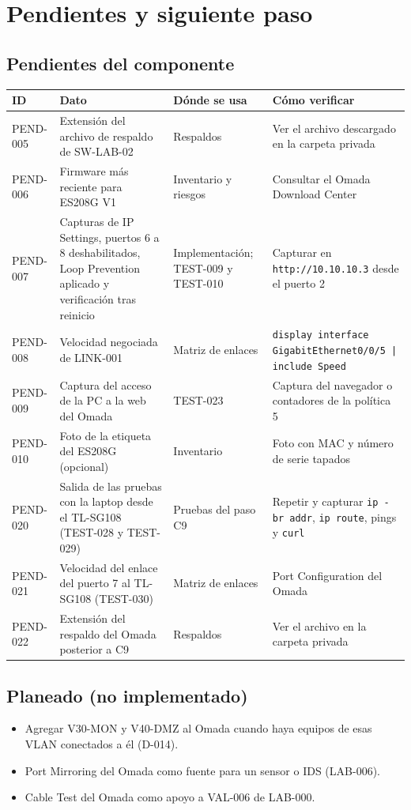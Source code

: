 \documentclass[11pt,a4paper]{article}
\newcommand{\cab}{\rowcolor{light}}
\begin{document}
\section{Pendientes y siguiente paso}
\subsection{Pendientes del componente}
{\small
\begin{longtable}{L{1.6cm} L{4.7cm} L{3.6cm} L{4.8cm}}
  \toprule
  \cab\textbf{ID} & \textbf{Dato} & \textbf{Dónde se usa} & \textbf{Cómo verificar}\\
  \midrule
  \endhead
  PEND-005 & Extensión del archivo de respaldo de SW-LAB-02 & Respaldos & Ver el archivo descargado en la carpeta privada\\
  PEND-006 & Firmware más reciente para ES208G V1 & Inventario y riesgos & Consultar el Omada Download Center\\
  PEND-007 & Capturas de IP Settings, puertos 6 a 8 deshabilitados, Loop Prevention aplicado y verificación tras reinicio & Implementación; TEST-009 y TEST-010 & Capturar en \texttt{http://10.10.10.3} desde el puerto 2\\
  PEND-008 & Velocidad negociada de LINK-001 & Matriz de enlaces & \texttt{display interface GigabitEthernet0/0/5 | include Speed}\\
  PEND-009 & Captura del acceso de la PC a la web del Omada & TEST-023 & Captura del navegador o contadores de la política 5\\
  PEND-010 & Foto de la etiqueta del ES208G (opcional) & Inventario & Foto con MAC y número de serie tapados\\
  PEND-020 & Salida de las pruebas con la laptop desde el TL-SG108 (TEST-028 y TEST-029) & Pruebas del paso C9 & Repetir y capturar \texttt{ip -br addr}, \texttt{ip route}, pings y \texttt{curl}\\
  PEND-021 & Velocidad del enlace del puerto 7 al TL-SG108 (TEST-030) & Matriz de enlaces & Port Configuration del Omada\\
  PEND-022 & Extensión del respaldo del Omada posterior a C9 & Respaldos & Ver el archivo en la carpeta privada\\
  \bottomrule
\end{longtable}
}

\subsection{Planeado (no implementado)}
\begin{itemize}
  \item Agregar V30-MON y V40-DMZ al Omada cuando haya equipos de esas VLAN conectados a él (D-014).
  \item Port Mirroring del Omada como fuente para un sensor o IDS (LAB-006).
  \item Cable Test del Omada como apoyo a VAL-006 de LAB-000.
\end{itemize}
\end{document}
